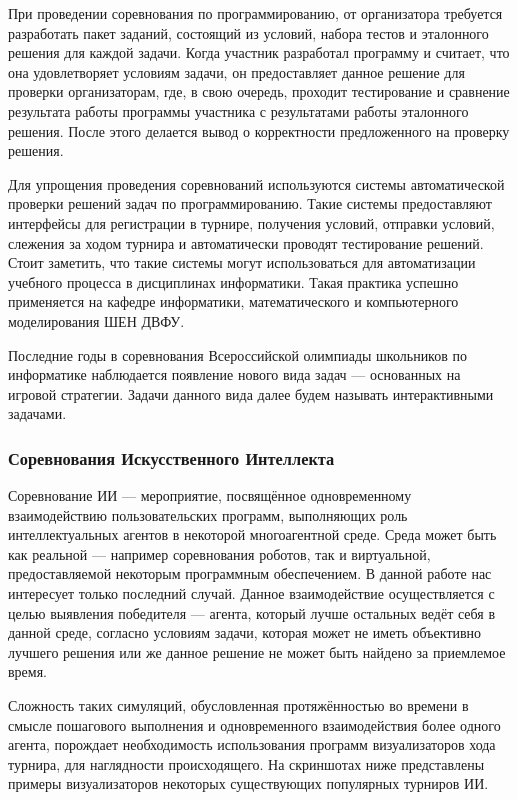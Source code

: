 \documentclass{imcs}
\begin{document}
При проведении соревнования по программированию, от организатора требуется разработать пакет заданий, состоящий из условий, набора тестов и эталонного решения для каждой задачи. Когда участник разработал программу и считает, что она удовлетворяет условиям задачи, он предоставляет данное решение для проверки организаторам, где, в свою очередь, проходит тестирование и сравнение результата работы программы участника с результатами работы эталонного решения. После этого делается вывод о корректности предложенного на проверку решения.

Для упрощения проведения соревнований используются системы автоматической проверки решений задач по программированию. Такие системы предоставляют интерфейсы для регистрации в турнире, получения условий, отправки условий, слежения за ходом турнира и автоматически проводят тестирование решений. Стоит заметить, что такие системы могут использоваться для автоматизации учебного процесса в дисциплинах информатики. Такая практика успешно применяется на кафедре информатики, математического и компьютерного моделирования ШЕН ДВФУ.

Последние годы в соревнования Всероссийской олимпиады школьников по информатике\cite{vseros} наблюдается появление нового вида задач — основанных на игровой стратегии\cite{elizarov}. Задачи данного вида далее будем называть интерактивными задачами.

\subsubsection{Соревнования Искусственного Интеллекта}
\label{ai_contest_intro}
Соревнование ИИ — мероприятие, посвящённое одновременному взаимодействию пользовательских программ, выполняющих роль интеллектуальных агентов в некоторой многоагентной среде. Среда может быть как реальной — например соревнования роботов, так и виртуальной, предоставляемой некоторым программным обеспечением. В данной работе нас интересует только последний случай. Данное взаимодействие осуществляется с целью выявления победителя — агента, который лучше остальных ведёт себя в данной среде, согласно условиям задачи, которая может не иметь объективно лучшего решения или же данное решение не может быть найдено за приемлемое время.

Сложность таких симуляций, обусловленная протяжённостью во времени в смысле пошагового выполнения и одновременного взаимодействия более одного агента, порождает необходимость использования программ визуализаторов хода турнира, для наглядности происходящего. На скриншотах ниже представлены примеры визуализаторов некоторых существующих популярных турниров ИИ.
\end{document}
